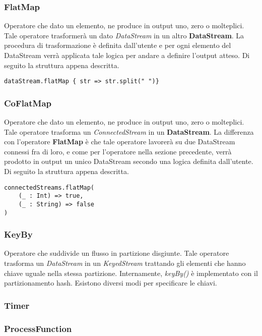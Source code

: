 \subsubsection{FlatMap}
Operatore che dato un elemento, ne produce in output uno, zero o molteplici. Tale operatore trasformerà un dato \textit{DataStream} in un altro \textbf{DataStream}. La procedura di trasformazione è definita dall'utente e per ogni elemento del DataStream verrà applicata tale logica per andare a definire l'output atteso. Di seguito la struttura appena descritta.

\begin{verbatim}
dataStream.flatMap { str => str.split(" ")}
\end{verbatim}
	
	
\subsubsection{CoFlatMap}
Operatore che dato un elemento, ne produce in output uno, zero o molteplici. Tale operatore trasforma un \textit{ConnectedStream} in un \textbf{DataStream}. La differenza con l'operatore \textbf{FlatMap} è che tale operatore lavorerà su due DataStream connessi fra di loro, e come per l'operatore nella sezione precedente, verrà prodotto in output un unico DataStream secondo una logica definita dall'utente. Di seguito la struttura appena descritta.

\begin{verbatim}
connectedStreams.flatMap(
    (_ : Int) => true,
    (_ : String) => false
)
\end{verbatim}

\subsubsection{KeyBy}
Operatore che suddivide un flusso in partizione disgiunte. Tale operatore trasforma un \textit{DataStream} in un \textit{KeyedStream} trattando gli elementi che hanno chiave uguale nella stessa partizione. Internamente, \textit{keyBy()} è implementato con il partizionamento hash. Esistono diversi modi per specificare le chiavi.
\subsubsection{Timer}
\subsubsection{ProcessFunction}


